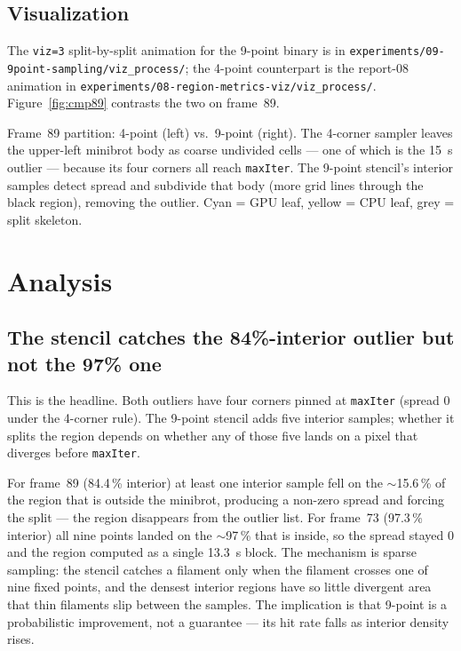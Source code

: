 \documentclass[
	english,
	letterpaper, oneside
]{article}
\begin{document}
\subsection{Visualization}

The \texttt{viz=3} split-by-split animation for the 9-point binary is in
\texttt{experiments/09-9point-sampling/viz\_process/}; the 4-point counterpart
is the report-08 animation in \texttt{experiments/08-region-metrics-viz/viz\_process/}.
Figure~\ref{fig:cmp89} contrasts the two on frame~89.

            {Frame~89 partition: 4-point (left) vs.\ 9-point (right). The
             4-corner sampler leaves the upper-left minibrot body as coarse
             undivided cells --- one of which is the 15~s outlier --- because
             its four corners all reach \texttt{maxIter}. The 9-point stencil's
             interior samples detect spread and subdivide that body (more grid
             lines through the black region), removing the outlier. Cyan = GPU
             leaf, yellow = CPU leaf, grey = split skeleton.
             \label{fig:cmp89}}

\section{Analysis}

\subsection{The stencil catches the 84\%-interior outlier but not the 97\% one}

This is the headline. Both outliers have four corners pinned at \texttt{maxIter}
(spread 0 under the 4-corner rule). The 9-point stencil adds five interior
samples; whether it splits the region depends on whether any of those
five lands on a pixel that diverges before \texttt{maxIter}.

For frame~89 (84.4\,\% interior) at least one interior sample fell on the
$\sim$15.6\,\% of the region that is outside the minibrot, producing a non-zero
spread and forcing the split --- the region disappears from the outlier list.
For frame~73 (97.3\,\% interior) all nine points landed on the $\sim$97\,\% that
is inside, so the spread stayed 0 and the region computed as a single 13.3~s
block. The mechanism is sparse sampling: the stencil catches a filament only
when the filament crosses one of nine fixed points, and the densest interior
regions have so little divergent area that thin filaments slip between the
samples. The implication is that 9-point is a probabilistic improvement, not a
guarantee --- its hit rate falls as interior density rises.
\end{document}
